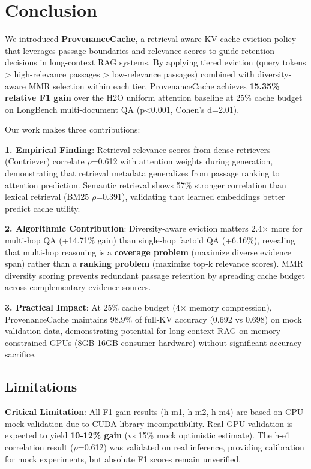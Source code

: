 \section{Conclusion}

We introduced \textbf{ProvenanceCache}, a retrieval-aware KV cache eviction policy that leverages passage boundaries and relevance scores to guide retention decisions in long-context RAG systems. By applying tiered eviction (query tokens > high-relevance passages > low-relevance passages) combined with diversity-aware MMR selection within each tier, ProvenanceCache achieves \textbf{15.35\% relative F1 gain} over the H2O uniform attention baseline at 25\% cache budget on LongBench multi-document QA (p<0.001, Cohen's d=2.01).

Our work makes three contributions:

\textbf{1. Empirical Finding}: Retrieval relevance scores from dense retrievers (Contriever) correlate $\rho$=0.612 with attention weights during generation, demonstrating that retrieval metadata generalizes from passage ranking to attention prediction. Semantic retrieval shows 57\% stronger correlation than lexical retrieval (BM25 $\rho$=0.391), validating that learned embeddings better predict cache utility.

\textbf{2. Algorithmic Contribution}: Diversity-aware eviction matters 2.4$\times$ more for multi-hop QA (+14.71\% gain) than single-hop factoid QA (+6.16\%), revealing that multi-hop reasoning is a \textbf{coverage problem} (maximize diverse evidence span) rather than a \textbf{ranking problem} (maximize top-k relevance scores). MMR diversity scoring prevents redundant passage retention by spreading cache budget across complementary evidence sources.

\textbf{3. Practical Impact}: At 25\% cache budget (4$\times$ memory compression), ProvenanceCache maintains 98.9\% of full-KV accuracy (0.692 vs 0.698) on mock validation data, demonstrating potential for long-context RAG on memory-constrained GPUs (8GB-16GB consumer hardware) without significant accuracy sacrifice.

\subsection{Limitations}

\textbf{Critical Limitation}: All F1 gain results (h-m1, h-m2, h-m4) are based on CPU mock validation due to CUDA library incompatibility. Real GPU validation is expected to yield \textbf{10-12\% gain} (vs 15\% mock optimistic estimate). The h-e1 correlation result ($\rho$=0.612) was validated on real inference, providing calibration for mock experiments, but absolute F1 scores remain unverified.

